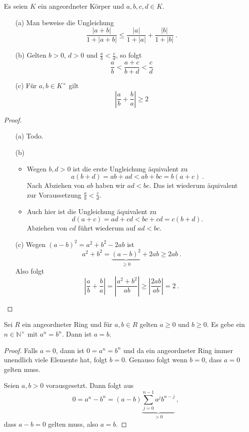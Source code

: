 \setcounter{aufgabe}{9}
\begin{aufgabe}
	Es seien $K$ ein angeordneter Körper und $a, b, c, d \in K$.
	\begin{enumerate}
		\item[(a)] Man beweise die Ungleichung
			\[
				\frac{| a + b|}{1 + |a+b|} \leq \frac{|a|}{1+|a|} + \frac{|b|}{1+|b|} \ .
			\]
		\item[(b)] Gelten $b > 0$, $d > 0$ und $\frac a b < \frac c d$, so folgt
			\[
				\frac a b < \frac{a + c}{b + d} < \frac c d
			\]
		\item[(c)] Für $a, b \in K^\times$ gilt
			\[
				\left| \frac a b + \frac b a \right| \geq 2
			\]
	\end{enumerate}
\end{aufgabe}
\begin{proof}
	\begin{enumerate}
		\item[(a)] Todo. %
		\item[(b)] 
			\begin{itemize}
				\item Wegen $b, d > 0$ ist die erste Ungleichung äquivalent zu 
					\[
						a(b+d) = ab + ad < ab + bc = b(a+c) \ .
					\]
					Nach Abziehen von $ab$ haben wir $ad < bc$. Das ist wiederum äquivalent
					zur Voraussetzung $\frac a b < \frac c d$.
				\item Auch hier ist die Ungleichung äquivalent zu 
					\[
						d(a+c) = ad + cd < bc + cd = c ( b+d) .
					\]
					Abziehen von $cd$ führt wiederum auf $ad < bc$.
			\end{itemize}
		\item[(c)] Wegen $(a-b)^2 = a^2 + b^2 - 2ab$ ist
			\[
				a^2 + b^2 = \underbrace{ (a-b)^2 }_{\geq 0} + 2ab \geq 2ab \ .
			\]
			Also folgt
			\[
				\left| \frac a b + \frac b a \right| = \left| \frac{a^2 + b^2}{ab} \right|
					\geq \left| \frac{2ab}{ab} \right| = 2 \ .
			\]
	\end{enumerate}
\end{proof}

\setcounter{aufgabe}{11}
\begin{aufgabe}
	Sei $R$ ein angeordneter Ring und für $a, b \in R$ gelten $a \geq 0$ und $b \geq 0$.
	Es gebe ein $n \in \mathbb N^\times$ mit $a^n = b^n$. Dann ist $a=b$.
\end{aufgabe}
\begin{proof}
	Falls $a=0$, dann ist $0 = a^n = b^n$ und da ein angeordneter Ring immer unendlich viele
	Elemente hat, folgt $b = 0$. Genauso folgt wenn $b=0$, dass $a=0$ gelten muss.

	Seien $a, b >0$ vorausgesetzt. Dann folgt aus
	\[
		0 = a^n -b^n = (a-b) \underbrace{ \sum_{j=0}^{n-1} a^j b^{n-j} }_{>0} \ ,
	\]
	dass $a-b=0$ gelten muss, also $a=b$.
\end{proof}


